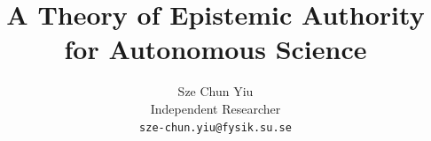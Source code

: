 \documentclass[11pt]{article}
\title{A Theory of Epistemic Authority for Autonomous Science}
\author{Sze Chun Yiu\\Independent Researcher\\\texttt{sze-chun.yiu@fysik.su.se}}
\date{}
\begin{document}
\maketitle












\nocite{*}


\end{document}
